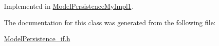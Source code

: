 Implemented in \hyperlink{class_model_persistence_my_impl1_a0a4c157a22510a188c4b76324ea666b0}{Model\-Persistence\-My\-Impl1}.



The documentation for this class was generated from the following file\-:\begin{DoxyCompactItemize}
\item 
\hyperlink{_model_persistence__if_8h}{Model\-Persistence\-\_\-if.\-h}\end{DoxyCompactItemize}
